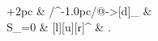 \documentclass{standalone}
\begin{document}
		\xymatrix@C+2pc{
			& \ar@/^-1.0pc/@{->}[d]_{} & \\
			\Delta S_{}=0 & \ar@{<=>}[l]\ar@{->}[u]\ar@{->}[r]^{} & .
		}
\end{document}
